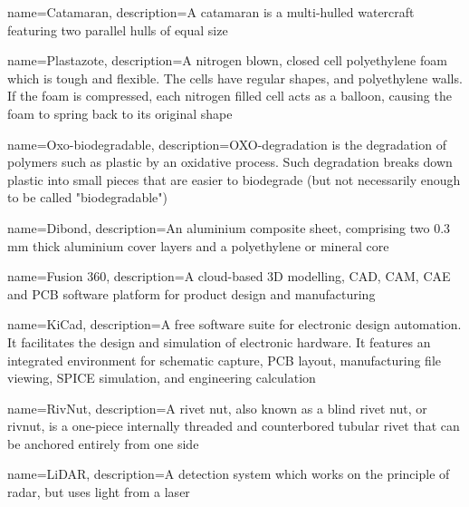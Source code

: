 {
    name=Catamaran,
    description={A catamaran is a multi-hulled watercraft featuring two parallel hulls of equal size}
}

{
	name=Plastazote,
	description={A nitrogen blown, closed cell polyethylene foam which is tough and flexible. The cells have regular shapes, and polyethylene walls. If the foam is compressed, each nitrogen filled cell acts as a balloon, causing the foam to spring back to its original shape}
}

{
	name=Oxo-biodegradable,
	description={OXO-degradation is the degradation of polymers such as plastic by an oxidative process. Such degradation breaks down plastic into small pieces that are easier to biodegrade (but not necessarily enough to be called "biodegradable")}
}

{
	name=Dibond,
	description={An aluminium composite sheet, comprising two 0.3 mm thick aluminium cover layers and a polyethylene or mineral core}
}

{
	name=Fusion 360,
	description={A cloud-based 3D modelling, CAD, CAM, CAE and PCB software platform for product design and manufacturing}
}

{
	name=KiCad,
	description={A free software suite for electronic design automation. It facilitates the design and simulation of electronic hardware. It features an integrated environment for schematic capture, PCB layout, manufacturing file viewing, SPICE simulation, and engineering calculation}
}

{
	name=RivNut,
	description={A rivet nut, also known as a blind rivet nut, or rivnut, is a one-piece internally threaded and counterbored tubular rivet that can be anchored entirely from one side}
}

{
	name=LiDAR,
	description={A detection system which works on the principle of radar, but uses light from a laser}
}